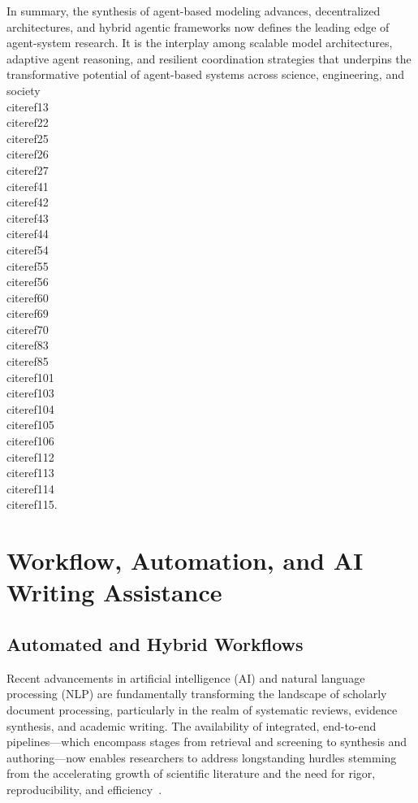 \documentclass[11pt]{article}
\begin{document}
In summary, the synthesis of agent-based modeling advances, decentralized architectures, and hybrid agentic frameworks now defines the leading edge of agent-system research. It is the interplay among scalable model architectures, adaptive agent reasoning, and resilient coordination strategies that underpins the transformative potential of agent-based systems across science, engineering, and society~\\cite{ref13}\\cite{ref22}\\cite{ref25}\\cite{ref26}\\cite{ref27}\\cite{ref41}\\cite{ref42}\\cite{ref43}\\cite{ref44}\\cite{ref54}\\cite{ref55}\\cite{ref56}\\cite{ref60}\\cite{ref69}\\cite{ref70}\\cite{ref83}\\cite{ref85}\\cite{ref101}\\cite{ref103}\\cite{ref104}\\cite{ref105}\\cite{ref106}\\cite{ref112}\\cite{ref113}\\cite{ref114}\\cite{ref115}.

\section{Workflow, Automation, and AI Writing Assistance}
\subsection{Automated and Hybrid Workflows}

Recent advancements in artificial intelligence (AI) and natural language processing (NLP) are fundamentally transforming the landscape of scholarly document processing, particularly in the realm of systematic reviews, evidence synthesis, and academic writing. The availability of integrated, end-to-end pipelines—which encompass stages from retrieval and screening to synthesis and authoring—now enables researchers to address longstanding hurdles stemming from the accelerating growth of scientific literature and the need for rigor, reproducibility, and efficiency~\cite{10,11,12,28,29,30,31,35,36,37,38,39,46,47,49,51,62,76,80,86,88,89,90,91,94,96,97,98,102,108}.
\end{document}
